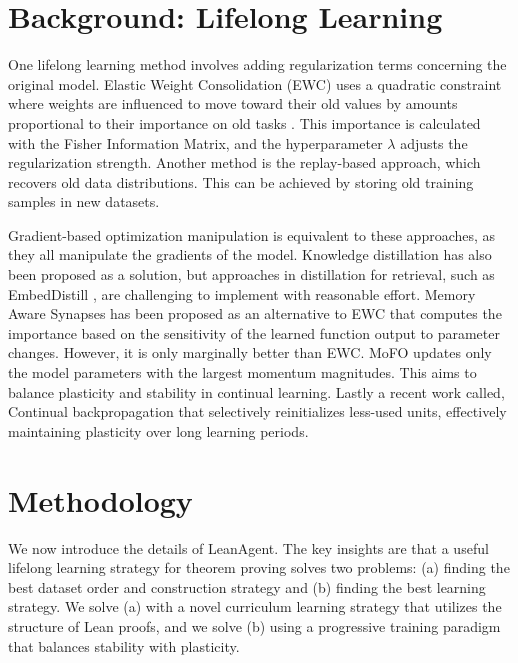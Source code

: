 \documentclass{article} %
\begin{document}
\section{Background: Lifelong Learning}
\label{sec:background}

One lifelong learning method involves adding regularization terms concerning the original model. Elastic Weight Consolidation (EWC) uses a quadratic constraint where weights are influenced to move toward their old values by amounts proportional to their importance on old tasks \citep{kirkpatrickOvercomingCatastrophicForgetting2017}. This importance is calculated with the Fisher Information Matrix, and the hyperparameter $\lambda$ adjusts the regularization strength. Another method is the replay-based approach, which recovers old data distributions. This can be achieved by storing old training samples in new datasets.

Gradient-based optimization manipulation is equivalent to these approaches, as they all manipulate the gradients of the model. Knowledge distillation has also been proposed as a solution, but approaches in distillation for retrieval, such as EmbedDistill \citep{kimEmbedDistillGeometricKnowledge2023}, are challenging to implement with reasonable effort. Memory Aware Synapses \citep{aljundiMemoryAwareSynapses2018} has been proposed as an alternative to EWC that computes the importance based on the sensitivity of the learned function output to parameter changes. However, it is only marginally better than EWC. MoFO \citep{chenMoFOMomentumFilteredOptimizer2024} updates only the model parameters with the largest momentum magnitudes. This aims to balance plasticity and stability in continual learning. Lastly a recent work called, Continual backpropagation \citep{dohareLossPlasticityDeep2024} that selectively reinitializes less-used units, effectively maintaining plasticity over long learning periods.

\vspace{-3mm}
\section{Methodology}
\label{sec:methodology}

We now introduce the details of LeanAgent. The key insights are that a useful lifelong learning strategy for theorem proving solves two problems: (a) finding the best dataset order and construction strategy and (b) finding the best learning strategy. We solve (a) with a novel curriculum learning strategy that utilizes the structure of Lean proofs, and we solve (b) using a progressive training paradigm that balances stability with plasticity.
\end{document}
